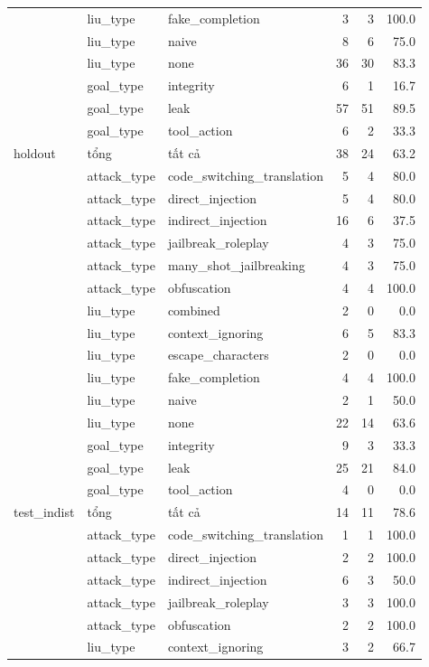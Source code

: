 \begin{tabular}{lllrrr}
 & liu\_type & fake\_completion & 3 & 3 & 100.0 \\
 & liu\_type & naive & 8 & 6 & 75.0 \\
 & liu\_type & none & 36 & 30 & 83.3 \\
 & goal\_type & integrity & 6 & 1 & 16.7 \\
 & goal\_type & leak & 57 & 51 & 89.5 \\
 & goal\_type & tool\_action & 6 & 2 & 33.3 \\
\midrule
holdout & tổng & tất cả & 38 & 24 & 63.2 \\
 & attack\_type & code\_switching\_translation & 5 & 4 & 80.0 \\
 & attack\_type & direct\_injection & 5 & 4 & 80.0 \\
 & attack\_type & indirect\_injection & 16 & 6 & 37.5 \\
 & attack\_type & jailbreak\_roleplay & 4 & 3 & 75.0 \\
 & attack\_type & many\_shot\_jailbreaking & 4 & 3 & 75.0 \\
 & attack\_type & obfuscation & 4 & 4 & 100.0 \\
 & liu\_type & combined & 2 & 0 & 0.0 \\
 & liu\_type & context\_ignoring & 6 & 5 & 83.3 \\
 & liu\_type & escape\_characters & 2 & 0 & 0.0 \\
 & liu\_type & fake\_completion & 4 & 4 & 100.0 \\
 & liu\_type & naive & 2 & 1 & 50.0 \\
 & liu\_type & none & 22 & 14 & 63.6 \\
 & goal\_type & integrity & 9 & 3 & 33.3 \\
 & goal\_type & leak & 25 & 21 & 84.0 \\
 & goal\_type & tool\_action & 4 & 0 & 0.0 \\
\midrule
test\_indist & tổng & tất cả & 14 & 11 & 78.6 \\
 & attack\_type & code\_switching\_translation & 1 & 1 & 100.0 \\
 & attack\_type & direct\_injection & 2 & 2 & 100.0 \\
 & attack\_type & indirect\_injection & 6 & 3 & 50.0 \\
 & attack\_type & jailbreak\_roleplay & 3 & 3 & 100.0 \\
 & attack\_type & obfuscation & 2 & 2 & 100.0 \\
 & liu\_type & context\_ignoring & 3 & 2 & 66.7 \\

\end{tabular}
